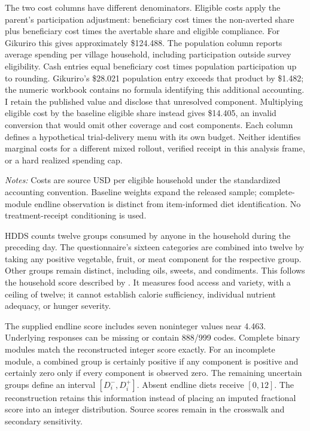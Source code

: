 \documentclass[11pt]{article}
\begin{document}
The two cost columns have different denominators. Eligible costs apply the parent's participation adjustment: beneficiary cost times the non-averted share plus beneficiary cost times the avertable share and eligible compliance. For Gikuriro this gives approximately \$124.488. The population column reports average spending per village household, including participation outside survey eligibility. Cash entries equal beneficiary cost times population participation up to rounding. Gikuriro's \$28.021 population entry exceeds that product by \$1.482; the numeric workbook contains no formula identifying this additional accounting. I retain the published value and disclose that unresolved component. Multiplying eligible cost by the baseline eligible share instead gives \$14.405, an invalid conversion that would omit other coverage and cost components. Each column defines a hypothetical trial-delivery menu with its own budget. Neither identifies marginal costs for a different mixed rollout, verified receipt in this analysis frame, or a hard realized spending cap.

\begin{table}[t]
\centering\caption{Village assignment, household observation, and provider costs}\label{tab:design}
\resizebox{\textwidth}{!}{}
\begin{minipage}{\textwidth}\footnotesize\emph{Notes:} Costs are source USD per eligible household under the standardized accounting convention. Baseline weights expand the released sample; complete-module endline observation is distinct from item-informed diet identification. No treatment-receipt conditioning is used.\end{minipage}
\end{table}

HDDS counts twelve groups consumed by anyone in the household during the preceding day. The questionnaire's sixteen categories are combined into twelve by taking any positive vegetable, fruit, or meat component for the respective group. Other groups remain distinct, including oils, sweets, and condiments. This follows the household score described by \citet{fao2011}. It measures food access and variety, with a ceiling of twelve; it cannot establish calorie sufficiency, individual nutrient adequacy, or hunger severity.

The supplied endline score includes seven noninteger values near 4.463. Underlying responses can be missing or contain 888/999 codes. Complete binary modules match the reconstructed integer score exactly. For an incomplete module, a combined group is certainly positive if any component is positive and certainly zero only if every component is observed zero. The remaining uncertain groups define an interval $[D_i^-,D_i^+]$. Absent endline diets receive $[0,12]$. The reconstruction retains this information instead of placing an imputed fractional score into an integer distribution. Source scores remain in the crosswalk and secondary sensitivity.
\end{document}
